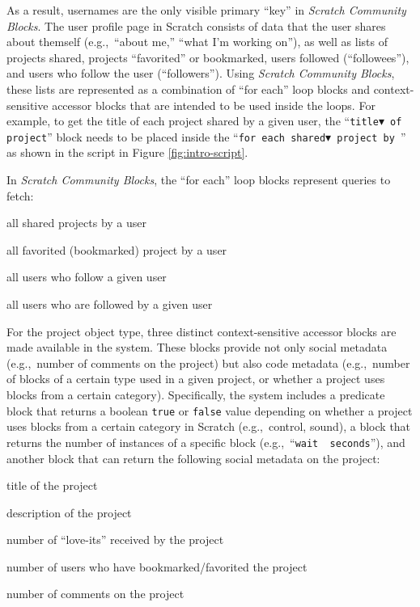 \documentclass{sigchi}
\newenvironment{itemize*}%
  {\begin{itemize}%
    \setlength{\itemsep}{2pt}%
    \setlength{\parskip}{0pt}}%
  {\end{itemize}}
\begin{document}
As a result, usernames are the only visible primary ``key'' in \emph{Scratch Community Blocks}. The user profile page in Scratch consists of data that the user shares about themself (e.g.,~``about me,'' ``what I'm working on''), as well as lists of projects shared, projects ``favorited'' or bookmarked, users followed (``followees''), and users who follow the user (``followers''). Using \emph{Scratch Community Blocks}, these lists are represented as a combination of ``for each'' loop blocks and context-sensitive accessor blocks that are intended to be used inside the loops. For example, to get the title of each project shared by a given user, the ``\texttt{title$\blacktriangledown$ of project}'' block needs to be placed inside the ``\texttt{for each shared$\blacktriangledown$ project by \underline{\hspace{0.5cm}}}'' as shown in the script in Figure \ref{fig:intro-script}. 

In \emph{Scratch Community Blocks}, the ``for each'' loop blocks represent queries to fetch:

\begin{itemize*}
    \item all shared projects by a user
    \item all favorited (bookmarked) project by a user
    \item all users who follow a given user
    \item all users who are followed by a given user
\end{itemize*}

For the project object type, three distinct context-sensitive accessor blocks are made available in the system. These blocks provide not only social metadata (e.g.,~number of comments on the project) but also code metadata (e.g.,~number of blocks of a certain type used in a given project, or whether a project uses blocks from a certain category). Specifically, the system includes a predicate block that returns a boolean \texttt{true} or \texttt{false} value depending on whether a project uses blocks from a certain category in Scratch (e.g.,~control, sound), a block that returns the number of instances of a specific block (e.g.,~``\texttt{wait \underline{\hspace{0.5cm}} seconds}''), and another block that can return the following social metadata on the project:

\begin{itemize*}
    \item title of the project
    \item description of the project
    \item number of ``love-its'' received by the project
    \item number of users who have bookmarked/favorited the project
    \item number of comments on the project
\end{itemize*}
\end{document}
